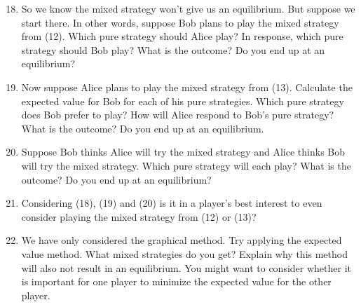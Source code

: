 \begin{enumerate}
\setcounter{enumi}{17}
\item So we know the mixed strategy won't give us an equilibrium. But suppose we start there. In other words, suppose Bob plans to play the mixed strategy from (12). Which pure strategy should Alice play? In response, which pure strategy should Bob play? What is the outcome? Do you end up at an equilibrium?

\item Now suppose Alice plans to play the mixed strategy from (13). Calculate the expected value for Bob for each of his pure strategies. Which pure strategy does Bob prefer to play? How will Alice respond to Bob's pure strategy? What is the outcome? Do you end up at an equilibrium.

\item Suppose Bob thinks Alice will try the mixed strategy and Alice thinks Bob will try the mixed strategy. Which pure strategy will each play? What is the outcome? Do you end up at an equilibrium?

\item Considering (18), (19) and (20) is it in a player's best interest to even consider playing the mixed strategy from (12) or (13)?

\item We have only considered the graphical method. Try applying the expected value method. What mixed strategies do you get? Explain why this method will also not result in an equilibrium. You might want to consider whether it is important for one player to minimize the expected value for the other player.

\end{enumerate}



 